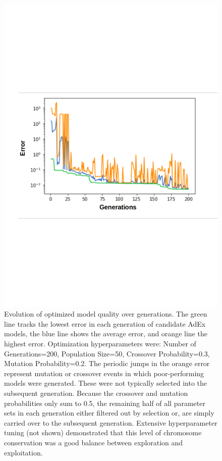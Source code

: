  
\begin{figure}
    \centering
    \includegraphics[scale=1]{figures/optimizer_internal_validation_annotated_yticks4.png}
    \caption[Optimizer error over generations]{Evolution of optimized model quality over generations.
    The green line tracks the lowest error in each generation of candidate AdEx models, the blue line shows the average error, and orange line the highest error.
    Optimization hyperparameters were: Number of Generations=200, Population Size=50, Crossover Probability=0.3, Mutation Probability=0.2.
    The periodic jumps in the orange error represent mutation or crossover events in which poor-performing models were generated.
    These were not typically selected into the subsequent generation.
    Because the crossover and mutation probabilities only sum to 0.5, the remaining half of all parameter sets in each generation either filtered out by selection or, are simply carried over to the subsequent generation.
    Extensive hyperparameter tuning (not shown) demonstrated that this level of chromosome conservation was a good balance between exploration and exploitation.}
    \label{fig:optimizer-evolution}
\end{figure}


